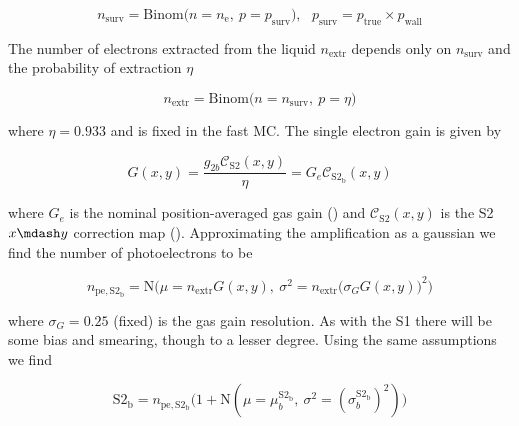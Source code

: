 \begin{equation}
n_{\mathrm{surv}} = \mathrm{Binom} \bigg( n = n_{\mathrm{e}},\ p = p_{\mathrm{surv}} \bigg) ,\ \ \
p_{\mathrm{surv}} = p_{\mathrm{true}} \times p_{\mathrm{wall}}
\label{eq:er_nr_calibrations_parameter_determ_det_phys_drift_electrons}
\end{equation}

The number of electrons extracted from the liquid $n_{\mathrm{extr}}$ depends only on $n_{\mathrm{surv}}$ and the probability of
extraction $\eta$

\begin{equation}
n_{\mathrm{extr}} = \mathrm{Binom} \Big( n = n_{\mathrm{surv}},\ p = \eta \Big)
\end{equation}

\noindent where $\eta = 0.933$ and is fixed in the fast MC.  The single electron gain is given by

\begin{equation}
G (x, y) = \frac{g_{2b} \mathcal{C}_{\mathrm{S2}}(x, y)}{\eta} = G_e \mathcal{C}_{\mathrm{S2_b}}(x, y)
\label{eq:er_nr_calibrations_parameter_determ_det_phys_gg}
\end{equation}

\noindent where $G_e$ is the nominal position-averaged gas gain () and
$\mathcal{C}_{\mathrm{S2}}(x, y)$ is the S2 $x \mdash y$ correction map ().  Approximating
the amplification as a gaussian we find the number of photoelectrons to be

\begin{equation}
n_{\mathrm{pe,S2_b}} =  \mathrm{N} \bigg( \mu = n_{\mathrm{extr}} G(x, y),\
\sigma^2 = n_{\mathrm{extr}} \Big( \sigma_{G} G(x, y) \Big)^2 \bigg)
\label{eq:er_nr_calibrations_parameter_determ_det_phys_s2_num_pe}
\end{equation}

\noindent where $\sigma_G = 0.25$ (fixed) is the gas gain resolution.  As with the S1 there will be some bias and smearing, though
to a lesser degree.  Using the same assumptions we find

\begin{equation}
\mathrm{S2_b} = n_{\mathrm{pe,S2_b}} \Big( 1 + \mathrm{N}(\mu = \mu_{b}^{\mathrm{S2_b}},\ \sigma^2 = (\sigma_{b}^{\mathrm{S2_b}})^2) \Big)
\label{eq:er_nr_calibrations_parameter_determ_det_phys_s2_bias_smear}
\end{equation}

